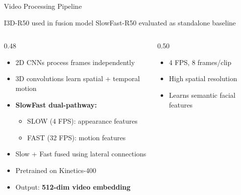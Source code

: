 \documentclass[aspectratio=169, 10pt]{beamer}
\begin{document}
\begin{frame}{Video Processing Pipeline}

\textcolor{NavyBlue}{\footnotesize
I3D-R50 used in fusion model \hfill SlowFast-R50 evaluated as standalone baseline}

\vspace{3pt}

\small

\begin{columns}[T,onlytextwidth]

\begin{column}{0.48\textwidth}

\begin{tcolorbox}[
bluecard,
title={\small Why 3D CNN? Why SlowFast?},
boxsep=2pt,
left=3pt,right=3pt,
top=3pt,bottom=3pt]

\footnotesize
\begin{itemize}[leftmargin=*, itemsep=1pt]
  \item 2D CNNs process frames independently
  \item 3D convolutions learn spatial + temporal motion
  \item \textbf{SlowFast dual-pathway:}
  \begin{itemize}[leftmargin=*]
    \item \textcolor{AccBlue}{SLOW (4 FPS):} appearance features
    \item \textcolor{AccTeal}{FAST (32 FPS):} motion features
  \end{itemize}
  \item Slow + Fast fused using lateral connections
  \item Pretrained on Kinetics-400
  \item Output: \textbf{512-dim video embedding}
\end{itemize}

\end{tcolorbox}

\end{column}

\begin{column}{0.50\textwidth}

\begin{tcolorbox}[
bluecard,
title={\small SLOW Pathway},
boxsep=2pt,
left=3pt,right=3pt,
top=3pt,bottom=3pt]

\footnotesize
\begin{itemize}[leftmargin=*, itemsep=1pt]
  \item 4 FPS, 8 frames/clip
  \item High spatial resolution
  \item Learns semantic facial features
\end{itemize}


\end{tcolorbox}
\end{column}
\end{columns}
\end{frame}
\end{document}
